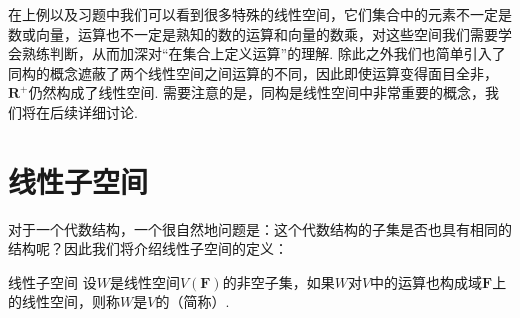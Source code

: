 

在上例以及习题中我们可以看到很多特殊的线性空间，它们集合中的元素不一定是数或向量，运算也不一定是熟知的数的运算和向量的数乘，对这些空间我们需要学会熟练判断，从而加深对``在集合上定义运算''的理解. 除此之外我们也简单引入了同构的概念遮蔽了两个线性空间之间运算的不同，因此即使运算变得面目全非，$\mathbf{R}^+$仍然构成了线性空间. 需要注意的是，同构是线性空间中非常重要的概念，我们将在后续详细讨论.

\section{线性子空间}

对于一个代数结构，一个很自然地问题是：这个代数结构的子集是否也具有相同的结构呢？因此我们将介绍线性子空间的定义：
\begin{definition}{线性子空间}{} 
    设$W$是线性空间$V(\mathbf{F})$的非空子集，如果$W$对$V$中的运算也构成域$\mathbf{F}$上的线性空间，则称$W$是$V$的（简称）.
\end{definition}


